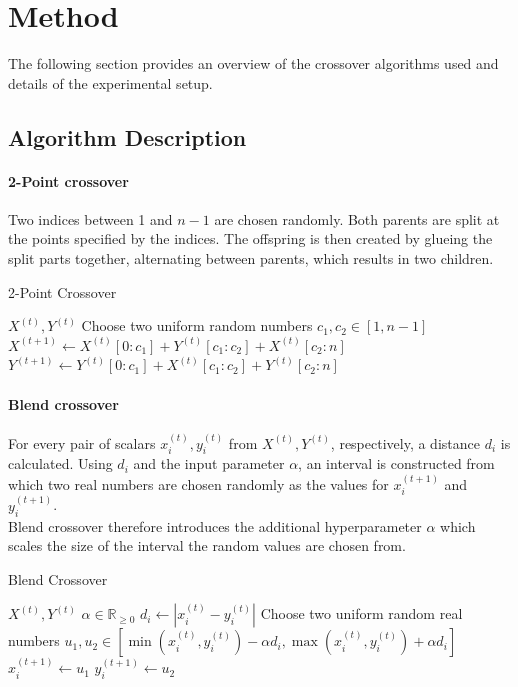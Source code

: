 \section{Method}
The following section provides an overview of the crossover algorithms used and details of the experimental setup.
\subsection{Algorithm Description}
\paragraph{2-Point crossover}
Two indices between 1 and $n-1$ are chosen randomly.
Both parents are split at the points specified by the indices.
The offspring is then created by glueing the split parts together, alternating between parents, which results in two children.
\begin{algorithm}
\caption{2-Point Crossover}\label{alg:2px}
\begin{algorithmic}

\Require $X^{(t)}, Y^{(t)}$
\State Choose two uniform random numbers $c_1, c_2 \in [1, n-1]$
\State $X^{(t+1)} \gets X^{(t)}[0:c_1] + Y^{(t)}[c_1:c_2] + X^{(t)}[c_2:n]$
\State $Y^{(t+1)} \gets Y^{(t)}[0:c_1] + X^{(t)}[c_1:c_2] + Y^{(t)}[c_2:n]$

\end{algorithmic}
\end{algorithm}

\paragraph{Blend crossover}
For every pair of scalars $x_i^{(t)}, y_i^{(t)}$ from $X^{(t)}, Y^{(t)}$, respectively, a distance $d_i$ is calculated.
Using $d_i$ and the input parameter $\alpha$, an interval is constructed from which two real numbers are chosen randomly as the values for $x_i^{(t+1)}$ and $y_i^{(t+1)}$. \\
Blend crossover therefore introduces the additional hyperparameter $\alpha$ which scales the size of the interval the random values are chosen from.
\begin{algorithm}
\caption{Blend Crossover}\label{alg:blendx}
\begin{algorithmic}

\Require $X^{(t)}, Y^{(t)}$
\Ensure $\alpha \in \mathbb{R}_{\geq 0}$
    \State $d_i \gets |x_i^{(t)} -  y_i^{(t)}|$
    \State Choose two uniform random real numbers
    \State $u_1, u_2 \in [\min(x_i^{(t)}, y_i^{(t)}) - \alpha d_i, \max(x_i^{(t)}, y_i^{(t)}) + \alpha d_i]$
    \State $x_i^{(t+1)} \gets u_1$
    \State $y_i^{(t+1)} \gets u_2$
\EndFor

\end{algorithmic}
\end{algorithm}

